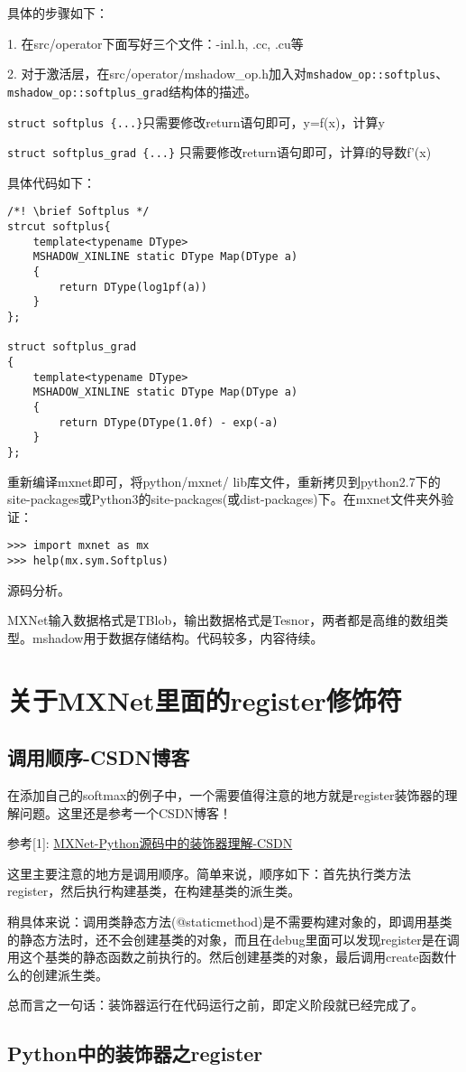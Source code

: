 具体的步骤如下：

1. 在src/operator下面写好三个文件：-inl.h, .cc, .cu等

2. 对于激活层，在src/operator/mshadow\_op.h加入对\verb|mshadow_op::softplus|、\verb|mshadow_op::softplus_grad|结构体的描述。

\verb|struct softplus {...}|只需要修改return语句即可，y=f(x)，计算y

\verb|struct softplus_grad {...}| 只需要修改return语句即可，计算f的导数f'(x)

具体代码如下：

\begin{lstlisting}
/*! \brief Softplus */
strcut softplus{
	template<typename DType> 
	MSHADOW_XINLINE static DType Map(DType a)
	{
	    return DType(log1pf(a))
	}
};

struct softplus_grad
{
	template<typename DType>
	MSHADOW_XINLINE static DType Map(DType a)
	{
		return DType(DType(1.0f) - exp(-a)
	}
};
\end{lstlisting}

重新编译mxnet即可，将python/mxnet/ lib库文件，重新拷贝到python2.7下的site-packages或Python3的site-packages(或dist-packages)下。在mxnet文件夹外验证：

\begin{verbatim}
>>> import mxnet as mx
>>> help(mx.sym.Softplus)
\end{verbatim}

源码分析。

MXNet输入数据格式是TBlob，输出数据格式是Tesnor，两者都是高维的数组类型。mshadow用于数据存储结构。代码较多，内容待续。



\section{关于MXNet里面的register修饰符}

\subsection{调用顺序-CSDN博客}

在添加自己的softmax的例子中，一个需要值得注意的地方就是register装饰器的理解问题。这里还是参考一个CSDN博客！

参考[1]: \href{https://blog.csdn.net/u011765306/article/details/54562266}{MXNet-Python源码中的装饰器理解-CSDN}

这里主要注意的地方是调用顺序。简单来说，顺序如下：首先执行类方法register，然后执行构建基类，在构建基类的派生类。

稍具体来说：调用类静态方法(@staticmethod)是不需要构建对象的，即调用基类的静态方法时，还不会创建基类的对象，而且在debug里面可以发现register是在调用这个基类的静态函数之前执行的。然后创建基类的对象，最后调用create函数什么的创建派生类。

总而言之一句话：装饰器运行在代码运行之前，即定义阶段就已经完成了。

\subsection{Python中的装饰器之register}














